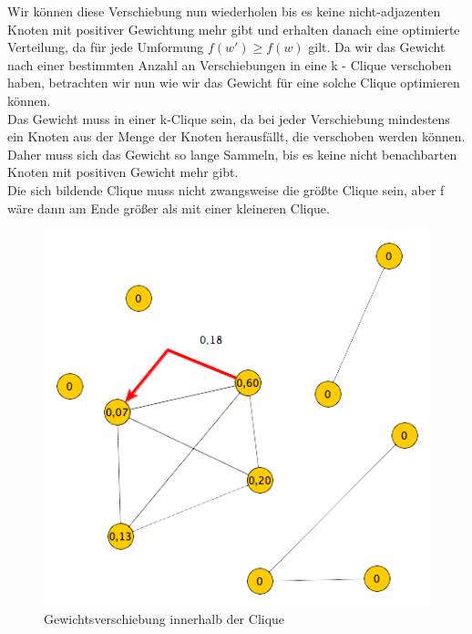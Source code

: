 \documentclass[12pt, a4paper]{article}
\begin{document}
Wir können diese Verschiebung nun wiederholen bis es keine nicht-adjazenten Knoten mit positiver Gewichtung mehr gibt und erhalten danach eine optimierte Verteilung, da für jede Umformung $f(w') \ge f(w)$ gilt. Da wir das Gewicht nach einer bestimmten Anzahl an Verschiebungen in eine k - Clique verschoben haben, betrachten wir nun wie wir das Gewicht für eine solche Clique optimieren können. \\
Das Gewicht muss in einer k-Clique sein, da bei jeder Verschiebung mindestens ein Knoten aus der Menge der Knoten herausfällt, die verschoben werden können. Daher muss sich das Gewicht so lange Sammeln, bis es keine nicht benachbarten Knoten mit positiven Gewicht mehr gibt. \\
Die sich bildende Clique muss nicht zwangsweise die größte Clique sein, aber f wäre dann am Ende größer als mit einer kleineren Clique.

\begin{figure}[H] 
		\centering
		\includegraphics[page=1, width=\textwidth]{assets/proof3_before_first_moving_step}
		\caption{Gewichtsverschiebung innerhalb der Clique} 
\end{figure}
\end{document}
